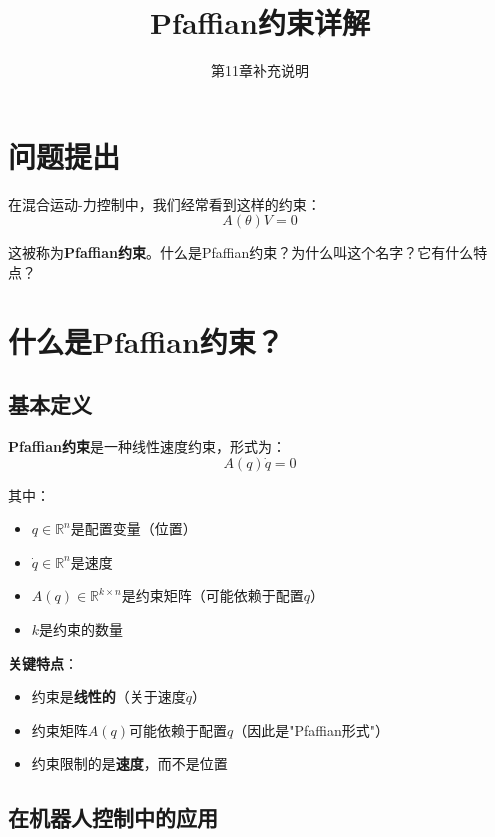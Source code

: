 \documentclass[12pt,a4paper]{article}
\title{Pfaffian约束详解}
\author{第11章补充说明}
\date{}
\begin{document}
\maketitle

\section{问题提出}

在混合运动-力控制中，我们经常看到这样的约束：
\begin{equation}
A(\theta)V = 0
\end{equation}

这被称为\textbf{Pfaffian约束}。什么是Pfaffian约束？为什么叫这个名字？它有什么特点？

\section{什么是Pfaffian约束？}

\subsection{基本定义}

\textbf{Pfaffian约束}是一种线性速度约束，形式为：
\begin{equation}
A(q)\dot{q} = 0
\end{equation}

其中：
\begin{itemize}
\item $q \in \mathbb{R}^n$是配置变量（位置）
\item $\dot{q} \in \mathbb{R}^n$是速度
\item $A(q) \in \mathbb{R}^{k \times n}$是约束矩阵（可能依赖于配置$q$）
\item $k$是约束的数量
\end{itemize}

\textbf{关键特点}：
\begin{itemize}
\item 约束是\textbf{线性的}（关于速度$\dot{q}$）
\item 约束矩阵$A(q)$可能依赖于配置$q$（因此是"Pfaffian形式"）
\item 约束限制的是\textbf{速度}，而不是位置
\end{itemize}

\subsection{在机器人控制中的应用}
\end{document}
